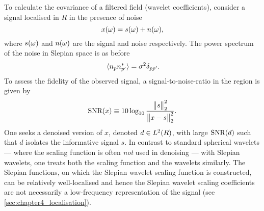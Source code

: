 To calculate the covariance of a filtered field (wavelet coefficients), consider a signal localised in \(R\) in the presence of noise
%
\begin{equation}\label{eq:chapter4_noised_signal}
	\pixel{x} = \pixel{s} + \pixel{n},
\end{equation}
%
where \(\pixel{s}\) and \(\pixel{n}\) are the signal and noise respectively.
The power spectrum of the noise in Slepian space is as before
%
\begin{equation}
	\expval*{\slepian{n} \conj{\slepian[']{n}}}
	= \sigma^{2} \delta_{pp'}.
\end{equation}
%
To assess the fidelity of the observed signal, a signal-to-noise-ratio in the region is given by
%
\begin{equation}\label{eq:chapter4_signal_to_noise}
	\snr{x}
	\equiv 10 \log_{10} \frac{\norm{s}^{2}}{\norm{x - s}^{2}}.
\end{equation}
%
One seeks a denoised version of \(x\), denoted \(d \in \hilbert{R}\), with large \(\snr{d}\) such that \(d\) isolates the informative signal \(s\).
In contrast to standard spherical wavelets --- where the scaling function is often \emph{not} used in denoising --- with Slepian wavelets, one treats both the scaling function and the wavelets similarly.
The Slepian functions, on which the Slepian wavelet scaling function is constructed, can be relatively well-localised and hence the Slepian wavelet scaling coefficients are not necessarily a low-frequency representation of the signal (see \cref{sec:chapter4_localisation}).

